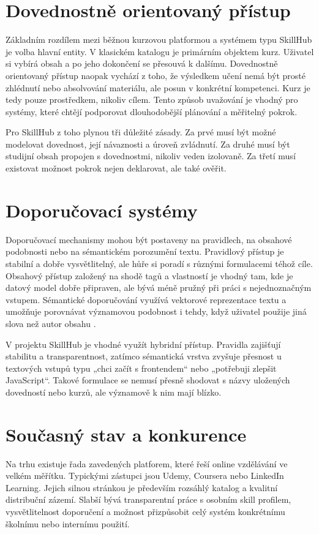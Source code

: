 \documentclass[12pt,a4paper]{report}
\begin{document}
\section{Dovednostně orientovaný přístup}
Základním rozdílem mezi běžnou kurzovou platformou a systémem typu SkillHub je volba hlavní entity. V klasickém katalogu je primárním objektem kurz. Uživatel si vybírá obsah a po jeho dokončení se přesouvá k dalšímu. Dovednostně orientovaný přístup naopak vychází z toho, že výsledkem učení nemá být prosté zhlédnutí nebo absolvování materiálu, ale posun v konkrétní kompetenci. Kurz je tedy pouze prostředkem, nikoliv cílem. Tento způsob uvažování je vhodný pro systémy, které chtějí podporovat dlouhodobější plánování a měřitelný pokrok.

Pro SkillHub z toho plynou tři důležité zásady. Za prvé musí být možné modelovat dovednost, její návaznosti a úroveň zvládnutí. Za druhé musí být studijní obsah propojen s dovednostmi, nikoliv veden izolovaně. Za třetí musí existovat možnost pokrok nejen deklarovat, ale také ověřit.

\section{Doporučovací systémy}
Doporučovací mechanismy mohou být postaveny na pravidlech, na obsahové podobnosti nebo na sémantickém porozumění textu. Pravidlový přístup je stabilní a dobře vysvětlitelný, ale hůře si poradí s různými formulacemi téhož cíle. Obsahový přístup založený na shodě tagů a vlastností je vhodný tam, kde je datový model dobře připraven, ale bývá méně pružný při práci s nejednoznačným vstupem. Sémantické doporučování využívá vektorové reprezentace textu a umožňuje porovnávat významovou podobnost i tehdy, když uživatel použije jiná slova než autor obsahu \cite{reimers,fastapi}.

V projektu SkillHub je vhodné využít hybridní přístup. Pravidla zajišťují stabilitu a transparentnost, zatímco sémantická vrstva zvyšuje přesnost u textových vstupů typu „chci začít s frontendem“ nebo „potřebuji zlepšit JavaScript“. Takové formulace se nemusí přesně shodovat s názvy uložených dovedností nebo kurzů, ale významově k nim mají blízko.

\section{Současný stav a konkurence}
Na trhu existuje řada zavedených platforem, které řeší online vzdělávání ve velkém měřítku. Typickými zástupci jsou Udemy, Coursera nebo LinkedIn Learning. Jejich silnou stránkou je především rozsáhlý katalog a kvalitní distribuční zázemí. Slabší bývá transparentní práce s osobním skill profilem, vysvětlitelnost doporučení a možnost přizpůsobit celý systém konkrétnímu školnímu nebo internímu použití.
\end{document}
